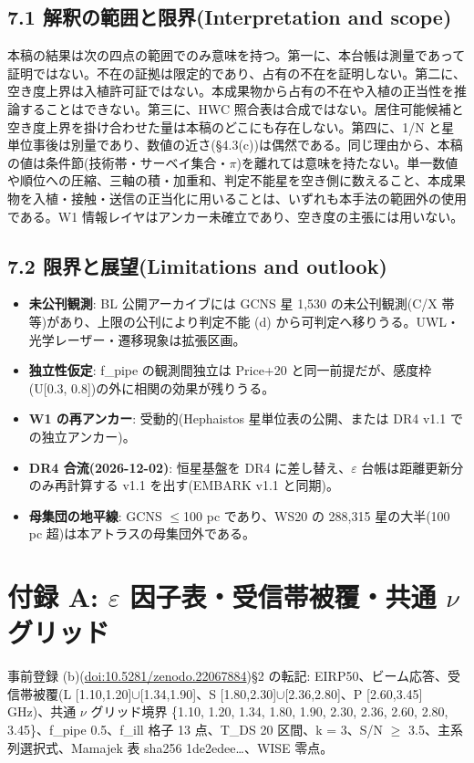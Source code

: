 \documentclass[11pt]{article}
\begin{document}
\subsection*{7.1 解釈の範囲と限界(Interpretation and scope)}
\noindent 本稿の結果は次の四点の範囲でのみ意味を持つ。第一に、本台帳は測量であって証明ではない。不在の証拠は限定的であり、占有の不在を証明しない。第二に、空き度上界は入植許可証ではない。本成果物から占有の不在や入植の正当性を推論することはできない。第三に、HWC 照合表は合成ではない。居住可能候補と空き度上界を掛け合わせた量は本稿のどこにも存在しない。第四に、1/N と星単位事後は別量であり、数値の近さ(\S{}4.3(c))は偶然である。同じ理由から、本稿の値は条件節(技術帯・サーベイ集合・\(\pi\))を離れては意味を持たない。単一数値や順位への圧縮、三軸の積・加重和、判定不能星を空き側に数えること、本成果物を入植・接触・送信の正当化に用いることは、いずれも本手法の範囲外の使用である。W1 情報レイヤはアンカー未確立であり、空き度の主張には用いない。\par\smallskip

\subsection*{7.2 限界と展望(Limitations and outlook)}
\begin{itemize}\setlength{\itemsep}{1pt}
\item \textbf{未公刊観測}: BL 公開アーカイブには GCNS 星 1,530 の未公刊観測(C/X 帯等)があり、上限の公刊により判定不能 (d) から可判定へ移りうる。UWL・光学レーザー・遷移現象は拡張区画。
\item \textbf{独立性仮定}: f\_pipe の観測間独立は Price+20 と同一前提だが、感度枠(U[0.3, 0.8])の外に相関の効果が残りうる。
\item \textbf{W1 の再アンカー}: 受動的(Hephaistos 星単位表の公開、または DR4 v1.1 での独立アンカー)。
\item \textbf{DR4 合流(2026-12-02)}: 恒星基盤を DR4 に差し替え、\(\varepsilon\) 台帳は距離更新分のみ再計算する v1.1 を出す(EMBARK v1.1 と同期)。
\item \textbf{母集団の地平線}: GCNS \(\leq\)100 pc であり、WS20 の 288,315 星の大半(100 pc 超)は本アトラスの母集団外である。
\end{itemize}

\section*{付録 A: \(\varepsilon\) 因子表・受信帯被覆・共通 \(\nu\) グリッド}
\noindent 事前登録 (b)(\url{doi:10.5281/zenodo.22067884})\S{}2 の転記: EIRP50、ビーム応答、受信帯被覆(L [1.10,1.20]\(\cup\)[1.34,1.90]、S [1.80,2.30]\(\cup\)[2.36,2.80]、P [2.60,3.45] GHz)、共通 \(\nu\) グリッド境界 \{1.10, 1.20, 1.34, 1.80, 1.90, 2.30, 2.36, 2.60, 2.80, 3.45\}、f\_pipe 0.5、f\_ill 格子 13 点、T\_DS 20 区間、k = 3、S/N \(\geq\) 3.5、主系列選択式、Mamajek 表 sha256 1de2edee\ldots{}、WISE 零点。\par\smallskip
\end{document}
